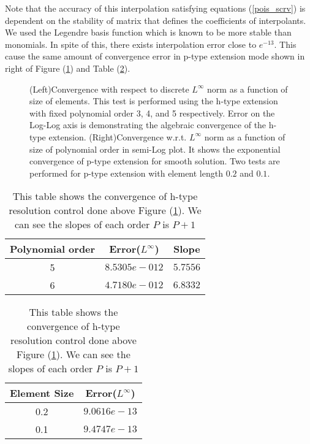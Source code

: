 Note that the accuracy of this interpolation satisfying equations (\ref{pois_scrv}) is dependent on the stability of matrix that defines the coefficients of interpolants. We used the Legendre basis function which is known to be more stable than monomials. In spite of this, there exists interpolation error close to $e^{-13}$. This cause the same amount of convergence error in p-type extension mode shown in right of Figure (\ref{ScrvconvDN}) and Table (\ref{hconv2t}).

\begin{figure}[h]
\begin{center}
\caption{\label{ScrvconvDN}
(Left)Convergence with respect to discrete $L^{\infty}$ norm as a function of size of elements. This test is performed using the h-type extension with fixed polynomial order 3, 4, and 5 respectively. Error on the Log-Log axis is demonstrating the algebraic convergence of the h-type extension.
(Right)Convergence w.r.t. $L^{\infty}$ norm as a function of size of polynomial order in semi-Log plot. It shows the exponential convergence of p-type extension for smooth solution. Two tests are performed for p-type extension with element length $0.2$ and $0.1$.
}
\end{center}
\end{figure}

\begin{table}[h]
\centering \caption{\label{hconv2t} This table shows the convergence of h-type resolution control done above Figure (\ref{ScrvconvDN}). We can see the slopes of each order $P$ is $P+1$ }
\begin{tabular}{|c|c|c|} \hline
    Polynomial order&Error($L^{\infty}$)&Slope   \\ \hline \hline
    5&$8.5305e-012$ &$5.7556$ \\ \hline
    6&$4.7180e-012$ &$6.8332$ \\ \hline
\end{tabular}
\hspace{.5in}
\begin{tabular}{|c|c|} \hline
    {Element Size}&Error($L^{\infty}$) \\ \hline \hline
    0.2&$9.0616e-13$  \\ \hline
    0.1&$9.4747e-13$ \\ \hline
\end{tabular}
\end{table}
